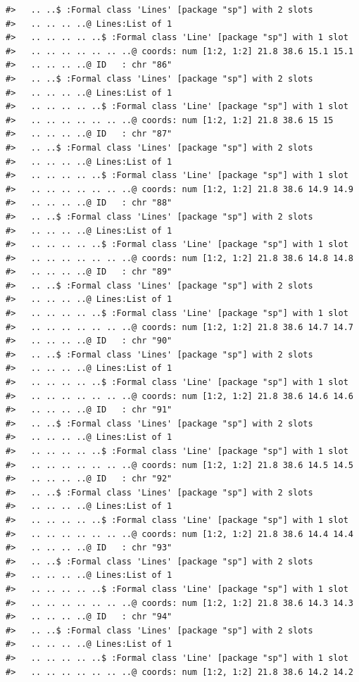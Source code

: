 \documentclass[12pt,a4paper,a4paper]{book}
\theoremstyle{definition}
\theoremstyle{definition}
\theoremstyle{definition}
\theoremstyle{remark}
\begin{document}
\begin{verbatim}
#>   .. ..$ :Formal class 'Lines' [package "sp"] with 2 slots
#>   .. .. .. ..@ Lines:List of 1
#>   .. .. .. .. ..$ :Formal class 'Line' [package "sp"] with 1 slot
#>   .. .. .. .. .. .. ..@ coords: num [1:2, 1:2] 21.8 38.6 15.1 15.1
#>   .. .. .. ..@ ID   : chr "86"
#>   .. ..$ :Formal class 'Lines' [package "sp"] with 2 slots
#>   .. .. .. ..@ Lines:List of 1
#>   .. .. .. .. ..$ :Formal class 'Line' [package "sp"] with 1 slot
#>   .. .. .. .. .. .. ..@ coords: num [1:2, 1:2] 21.8 38.6 15 15
#>   .. .. .. ..@ ID   : chr "87"
#>   .. ..$ :Formal class 'Lines' [package "sp"] with 2 slots
#>   .. .. .. ..@ Lines:List of 1
#>   .. .. .. .. ..$ :Formal class 'Line' [package "sp"] with 1 slot
#>   .. .. .. .. .. .. ..@ coords: num [1:2, 1:2] 21.8 38.6 14.9 14.9
#>   .. .. .. ..@ ID   : chr "88"
#>   .. ..$ :Formal class 'Lines' [package "sp"] with 2 slots
#>   .. .. .. ..@ Lines:List of 1
#>   .. .. .. .. ..$ :Formal class 'Line' [package "sp"] with 1 slot
#>   .. .. .. .. .. .. ..@ coords: num [1:2, 1:2] 21.8 38.6 14.8 14.8
#>   .. .. .. ..@ ID   : chr "89"
#>   .. ..$ :Formal class 'Lines' [package "sp"] with 2 slots
#>   .. .. .. ..@ Lines:List of 1
#>   .. .. .. .. ..$ :Formal class 'Line' [package "sp"] with 1 slot
#>   .. .. .. .. .. .. ..@ coords: num [1:2, 1:2] 21.8 38.6 14.7 14.7
#>   .. .. .. ..@ ID   : chr "90"
#>   .. ..$ :Formal class 'Lines' [package "sp"] with 2 slots
#>   .. .. .. ..@ Lines:List of 1
#>   .. .. .. .. ..$ :Formal class 'Line' [package "sp"] with 1 slot
#>   .. .. .. .. .. .. ..@ coords: num [1:2, 1:2] 21.8 38.6 14.6 14.6
#>   .. .. .. ..@ ID   : chr "91"
#>   .. ..$ :Formal class 'Lines' [package "sp"] with 2 slots
#>   .. .. .. ..@ Lines:List of 1
#>   .. .. .. .. ..$ :Formal class 'Line' [package "sp"] with 1 slot
#>   .. .. .. .. .. .. ..@ coords: num [1:2, 1:2] 21.8 38.6 14.5 14.5
#>   .. .. .. ..@ ID   : chr "92"
#>   .. ..$ :Formal class 'Lines' [package "sp"] with 2 slots
#>   .. .. .. ..@ Lines:List of 1
#>   .. .. .. .. ..$ :Formal class 'Line' [package "sp"] with 1 slot
#>   .. .. .. .. .. .. ..@ coords: num [1:2, 1:2] 21.8 38.6 14.4 14.4
#>   .. .. .. ..@ ID   : chr "93"
#>   .. ..$ :Formal class 'Lines' [package "sp"] with 2 slots
#>   .. .. .. ..@ Lines:List of 1
#>   .. .. .. .. ..$ :Formal class 'Line' [package "sp"] with 1 slot
#>   .. .. .. .. .. .. ..@ coords: num [1:2, 1:2] 21.8 38.6 14.3 14.3
#>   .. .. .. ..@ ID   : chr "94"
#>   .. ..$ :Formal class 'Lines' [package "sp"] with 2 slots
#>   .. .. .. ..@ Lines:List of 1
#>   .. .. .. .. ..$ :Formal class 'Line' [package "sp"] with 1 slot
#>   .. .. .. .. .. .. ..@ coords: num [1:2, 1:2] 21.8 38.6 14.2 14.2

\end{verbatim}
\end{document}
